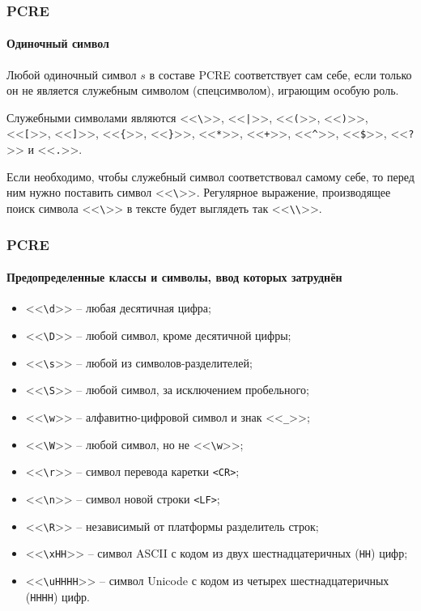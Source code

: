 \begin{frame}[fragile]
    \frametitle{PCRE}
    \framesubtitle{Одиночный символ}
    
    Любой одиночный символ $s$ в составе PCRE соответствует сам себе, если только он не является служебным символом (спецсимволом), играющим особую роль. 
    
    Служебными символами являются <<\verb"\">>, <<\verb"|">>, <<\verb"(">>, <<\verb")">>, <<\verb"[">>, <<\verb"]">>, <<\verb"{">>, <<\verb"}">>, <<\verb"*">>, <<\verb"+">>, <<\verb"^">>, <<\verb"$">>, <<\verb"?">> и <<\verb".">>. 
    
    Если необходимо, чтобы служебный символ соответствовал самому себе, то перед ним нужно поставить символ <<\verb"\">>. Регулярное выражение, производящее поиск символа <<\verb"\">> в тексте будет выглядеть так <<\verb"\\">>.
\end{frame}

\begin{frame}[fragile]
    \frametitle{PCRE}
    \framesubtitle{Предопределенные классы и символы, ввод которых затруднён}
    
    \begin{itemize}
        \item{} <<\verb"\d">> – любая десятичная цифра;
        \item{} <<\verb"\D">> – любой символ, кроме десятичной цифры;
        \item{} <<\verb"\s">> – любой из символов-разделителей;
        \item{} <<\verb"\S">> – любой символ, за исключением пробельного;
        \item{} <<\verb"\w">> – алфавитно-цифровой символ и знак <<\verb"_">>;
        \item{} <<\verb"\W">> – любой символ, но не <<\verb"\w">>;
        \item{} <<\verb"\r">>  – символ перевода каретки \verb"<CR>";
        \item{} <<\verb"\n">>  – символ новой строки \verb"<LF>";
        \item{} <<\verb"\R">>  – независимый от платформы разделитель строк;
        \item{} <<\verb"\xHH">> – символ ASCII с кодом из двух шестнадцатеричных (\verb"HH") цифр;
        \item{} <<\verb"\uHHHH">> – символ Unicode с кодом из четырех шестнадцатеричных (\verb"HHHH") цифр.
    \end{itemize}
\end{frame}

